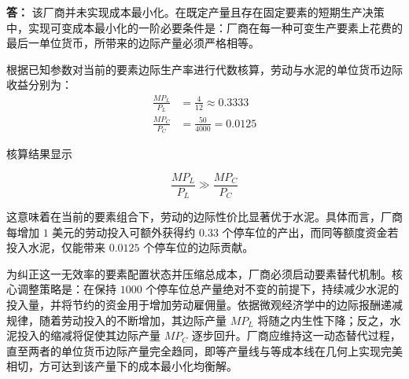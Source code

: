 \begin{enumerate}[label=\textbf{\arabic*.}, leftmargin=*]
		\textbf{答：}
		该厂商并未实现成本最小化。在既定产量且存在固定要素的短期生产决策中，实现可变成本最小化的一阶必要条件是：厂商在每一种可变生产要素上花费的最后一单位货币，所带来的边际产量必须严格相等。
		
		根据已知参数对当前的要素边际生产率进行代数核算，劳动与水泥的单位货币边际收益分别为：
		\[
		\begin{aligned}
			\frac{MP_L}{P_L} &= \frac{4}{12} \approx 0.3333 \\
			\frac{MP_C}{P_C} &= \frac{50}{4000} = 0.0125
		\end{aligned}
		\]
		
		核算结果显示
		
		$$\frac{MP_L}{P_L} \gg \frac{MP_C}{P_C}$$
		
		这意味着在当前的要素组合下，劳动的边际性价比显著优于水泥。具体而言，厂商每增加 $1$ 美元的劳动投入可额外获得约 $0.33$ 个停车位的产出，而同等额度资金若投入水泥，仅能带来 $0.0125$ 个停车位的边际贡献。
		
		为纠正这一无效率的要素配置状态并压缩总成本，厂商必须启动要素替代机制。核心调整策略是：在保持 $1000$ 个停车位总产量绝对不变的前提下，持续减少水泥的投入量，并将节约的资金用于增加劳动雇佣量。依据微观经济学中的边际报酬递减规律，随着劳动投入的不断增加，其边际产量 $MP_L$ 将随之内生性下降；反之，水泥投入的缩减将促使其边际产量 $MP_C$ 逐步回升。厂商应维持这一动态替代过程，直至两者的单位货币边际产量完全趋同，即等产量线与等成本线在几何上实现完美相切，方可达到该产量下的成本最小化均衡解。
	\end{enumerate}
	
	\newpage
